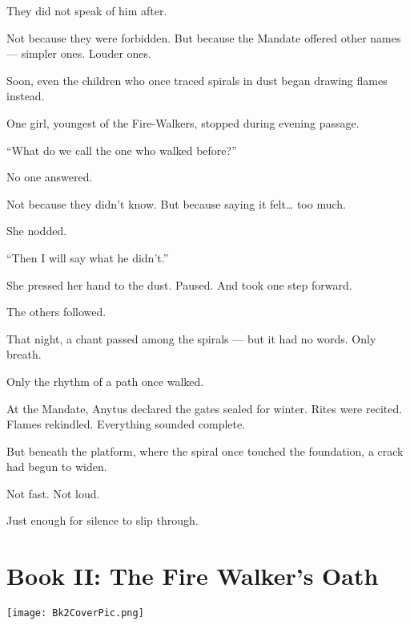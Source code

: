 \documentclass[9pt]{article}
\begin{document}
They did not speak of him after.

Not because they were forbidden.  
But because the Mandate offered other names —  
simpler ones.  
Louder ones.

Soon, even the children who once traced spirals in dust  
began drawing flames instead.

One girl, youngest of the Fire-Walkers,  
stopped during evening passage.

 “What do we call the one who walked before?”

No one answered.

Not because they didn’t know.  
But because saying it felt… too much.

She nodded.

 “Then I will say what he didn’t.”

She pressed her hand to the dust.  
Paused.  
And took one step forward.

The others followed.

That night, a chant passed among the spirals —  
but it had no words.  
Only breath.

Only the rhythm of a path once walked.

At the Mandate, Anytus declared the gates sealed for winter.  
Rites were recited.  
Flames rekindled.  
Everything sounded complete.

But beneath the platform,  
where the spiral once touched the foundation,  
a crack had begun to widen.

Not fast.  
Not loud.

Just enough  
for silence to slip through.

\newpage

\section*{Book II: The Fire Walker's Oath}

\vspace{1in}

\begin{center}
    \texttt{[image: Bk2CoverPic.png]}
\end{center}

\vspace{1in}
\end{document}
